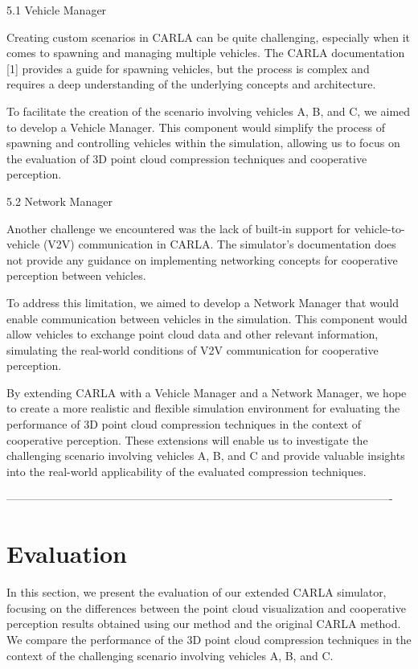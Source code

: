 \documentclass[conference]{IEEEtran}
\begin{document}
5.1 Vehicle Manager

Creating custom scenarios in CARLA can be quite challenging, especially when it comes to spawning and managing multiple vehicles. The CARLA documentation [1] provides a guide for spawning vehicles, but the process is complex and requires a deep understanding of the underlying concepts and architecture.

To facilitate the creation of the scenario involving vehicles A, B, and C, we aimed to develop a Vehicle Manager. This component would simplify the process of spawning and controlling vehicles within the simulation, allowing us to focus on the evaluation of 3D point cloud compression techniques and cooperative perception.

5.2 Network Manager

Another challenge we encountered was the lack of built-in support for vehicle-to-vehicle (V2V) communication in CARLA. The simulator's documentation does not provide any guidance on implementing networking concepts for cooperative perception between vehicles.

To address this limitation, we aimed to develop a Network Manager that would enable communication between vehicles in the simulation. This component would allow vehicles to exchange point cloud data and other relevant information, simulating the real-world conditions of V2V communication for cooperative perception.

By extending CARLA with a Vehicle Manager and a Network Manager, we hope to create a more realistic and flexible simulation environment for evaluating the performance of 3D point cloud compression techniques in the context of cooperative perception. These extensions will enable us to investigate the challenging scenario involving vehicles A, B, and C and provide valuable insights into the real-world applicability of the evaluated compression techniques.

-------------------------------------------------------------------------------------------------------


\section{Evaluation}
In this section, we present the evaluation of our extended CARLA simulator, focusing on the differences between the point cloud visualization and cooperative perception results obtained using our method and the original CARLA method. We compare the performance of the 3D point cloud compression techniques in the context of the challenging scenario involving vehicles A, B, and C.
\end{document}
